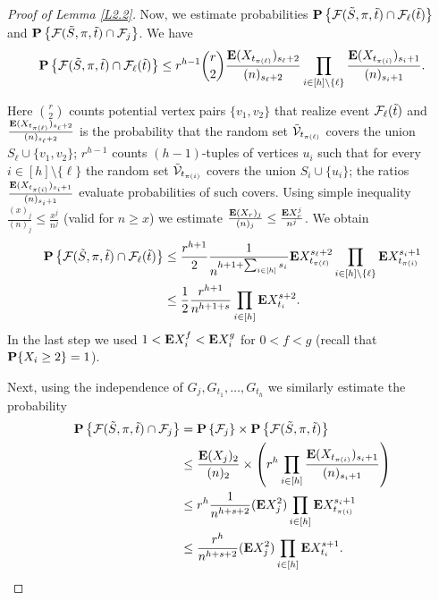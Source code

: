 \documentclass[11pt, a4paper]{article}
\newcommand{\E}{{\bf{E}}}
\newcommand{\PP}{{\bf{P}}}
\begin{document}
\begin{proof}[Proof of Lemma \ref{L2.2}]
Now, we estimate  probabilities
$\PP\left\{{\cal F}({\tilde S}, \pi, {\tilde t})
\cap
{\cal F}_{\ell}({\tilde t})\right\}$ 
and
$\PP\left\{{\cal F}({\tilde S}, \pi, {\tilde t})
\cap
{\cal F}_j\right\}$.
 We have
\begin{align*}
\PP\left\{{\cal F}({\tilde S}, \pi, {\tilde t})
\cap
{\cal F}_{\ell}({\tilde t})\right\}
\le
r^{h-1}\binom{r}{2}
\frac{\E(X_{t_{\pi(\ell)}})_{s_{\ell}+2}}
{(n)_{s_{\ell}+2}}
\prod_{i\in[h]\setminus\{\ell\}}
\frac{\E(X_{t_{\pi(i)}})_{s_i+1}}{(n)_{s_i+1}}.
\end{align*}

 
Here $\binom{r}{2}$  counts potential vertex pairs $\{v_1,v_2\}$ that 
realize event 
${\cal F}_{\ell}({\tilde t})$  and
$\frac{\E(X_{t_{\pi(\ell)}})_{s_{\ell}+2}}
{(n)_{s_{\ell}+2}}$ is the probability that the random set
${\tilde {\cal V}}_{t_{\pi(\ell)}}$ covers the union 
$S_{\ell}\cup\{v_1,v_2\}$; 
$r^{h-1}$ counts 
$(h-1)$-tuples of vertices $u_i$
 such that for every $i\in[h]\setminus\{\ell\}$ the random set 
 ${\tilde {\cal V}}_{t_{\pi(i)}}$ covers the union  $S_i\cup\{u_i\}$; the ratios 
$\frac{\E(X_{t_{\pi(i)}})_{s_i+1}}{(n)_{s_i+1}}$
evaluate  probabilities of such covers.
Using simple 
inequality $\frac{(x)_j}{(n)_j}\le \frac{x^j}{n^j}$ 
(valid 
for $n\ge x$) we estimate 
$\frac{\E(X_r)_{j}}
{(n)_j}\le \frac{\E X_r^j}{n^j}$. 
We obtain
\begin{align}
\label{2025-08-06+r}
\PP\left\{{\cal F}({\tilde S}, \pi, {\tilde t})
\cap
{\cal F}_{\ell}({\tilde t})\right\}
&
\le
\frac{r^{h+1}}{2}
\frac{1}
{n^{h+1+\sum_{i\in [h]}s_i}}
\E X_{t_{\pi(\ell)}}^{s_{\ell}+2}
\prod_{i\in[h]\setminus\{\ell\}}
\E X_{t_{\pi(i)}}^{s_i+1}
\\
\nonumber
&
\le \frac{1}{2}
\frac{r^{h+1}}{n^{h+1+s}}
\prod_{i\in[h]}
\E X_{t_i}^{s+2}.
\end{align}
In the last step  we used $1<\E X_i^f<\E X_i^g$
 for $0<f<g$ (recall that $\PP\{X_i\ge 2\}=1$).

Next, using the independence of $G_j,G_{t_1},\dots, G_{t_h}$
 we similarly estimate the probability
\begin{align}
\nonumber
\PP\left\{{\cal F}({\tilde S}, \pi, {\tilde t})
\cap
{\cal F}_j\right\}
&
=
\PP\left\{
{\cal F}_j\right\}
\times
\PP\left\{{\cal F}({\tilde S}, \pi, {\tilde t})
\right\}
\\
\nonumber
&
\le
\frac{\E(X_j)_{2}}{(n)_{2}}
\times
\left(r^{h}
\prod_{i\in[h]}
\frac{\E(X_{t_{\pi(i)}})_{s_i+1}}{(n)_{s_i+1}}
\right)
\\
\nonumber
&
\le
r^h\frac{1}{n^{h+s+2}} (\E X_j^2)\prod_{i\in[h]}\E X_{t_{\pi(i)}}^{s_i+1}
\\
\label{2025-08-13+r}
&
\le
\frac{r^h}{n^{h+s+2}} (\E X_j^2)
\prod_{i\in[h]}\E X_{t_i}^{s+1}.
\end{align}


\end{proof}
\end{document}
